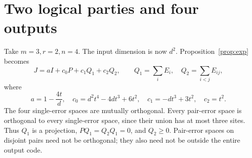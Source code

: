 \documentclass[11pt,a4paper]{article}
\begin{document}
\section{Two logical parties and four outputs}
Take \(m=3,r=2,n=4\). The input dimension is now \(d^2\). Proposition~\ref{prop:exp} becomes
\begin{equation}\label{eq:twoexp}
 J=aI+c_0P+c_1Q_1+c_2Q_2,\qquad
 Q_1=\sum_iE_i,\quad Q_2=\sum_{i<j}E_{ij},
\end{equation}
where
\[
 a=1-\frac{4t}{d},\quad
 c_0=d^2t^4-4dt^3+6t^2,\quad
 c_1=-dt^3+3t^2,\quad c_2=t^2.
\]
The four single-error spaces are mutually orthogonal. Every pair-error space is orthogonal to every single-error space, since their union has at most three sites. Thus \(Q_1\) is a projection, \(PQ_1=Q_2Q_1=0\), and \(Q_2\ge0\). Pair-error spaces on disjoint pairs need not be orthogonal; they also need not be outside the entire output code.
\end{document}
